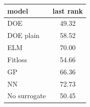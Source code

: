 \begin{tabular}{|lc|}
\hline
model & last rank\\
\hline
DOE & 49.32 \\
DOE plain & 58.52 \\
ELM & 70.00 \\
Fitloss & 54.66 \\
GP & 66.36 \\
NN & 72.73 \\
No surrogate & 50.45 \\
\hline
\end{tabular}
